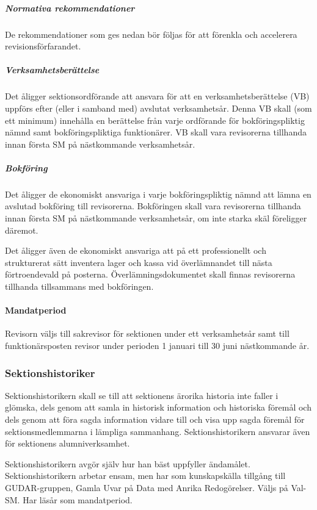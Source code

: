 \documentclass{dgovdoc}
\begin{document}
\subparagraph{Normativa rekommendationer}

De rekommendationer som ges nedan bör följas för att förenkla och accelerera revisionsförfarandet.

\subparagraph{Verksamhetsberättelse}

Det åligger sektionsordförande att ansvara för att en verksamhetsberättelse (VB) uppförs efter (eller i samband med) avslutat verksamhetsår. Denna VB skall (som ett minimum) innehålla en berättelse från varje ordförande för bokföringspliktig nämnd samt bokföringspliktiga funktionärer. VB skall vara revisorerna tillhanda innan första SM på nästkommande verksamhetsår.

\subparagraph{Bokföring}

Det åligger de ekonomiskt ansvariga i varje bokföringspliktig nämnd att lämna en avslutad bokföring till revisorerna. Bokföringen skall vara revisorerna tillhanda innan första SM på nästkommande verksamhetsår, om inte starka skäl föreligger däremot.

Det åligger även de ekonomiskt ansvariga att på ett professionellt och strukturerat sätt inventera lager och kassa vid överlämnandet till nästa förtroendevald på posterna. Överlämningsdokumentet skall finnas revisorerna tillhanda tillsammans med bokföringen.

\paragraph{Mandatperiod}

Revisorn väljs till sakrevisor för sektionen under ett verksamhetsår samt till funktionärsposten revisor under perioden 1 januari till 30 juni nästkommande år.

\subsubsection{Sektionshistoriker}

Sektionshistorikern skall se till att sektionens ärorika historia inte faller i
glömska, dels genom att samla in historisk information och historiska föremål och dels genom att föra sagda information vidare till och visa upp sagda föremål för sektionsmedlemmarna i lämpliga sammanhang. Sektionshistorikern ansvarar även för sektionens alumniverksamhet.

Sektionshistorikern avgör själv hur han bäst uppfyller ändamålet. Sektionshistorikern arbetar ensam, men har som kunskapskälla tillgång till GUDAR-gruppen, Gamla Uvar på Data med Anrika Redogörelser. Väljs på Val-SM. Har läsår som mandatperiod.
\end{document}

